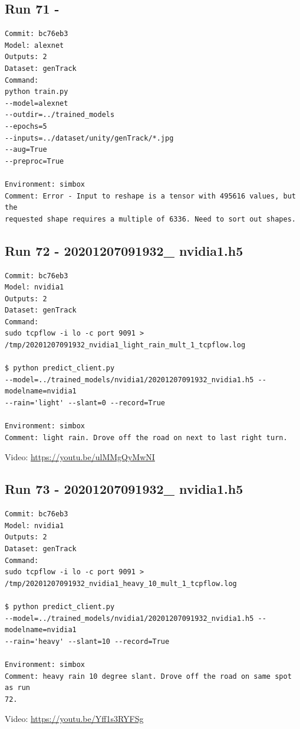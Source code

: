 \subsection{Run 71 - }
\label{app_res:XX}
\begin{verbatim}
Commit: bc76eb3 
Model: alexnet
Outputs: 2 
Dataset: genTrack
Command:
python train.py
--model=alexnet
--outdir=../trained_models
--epochs=5
--inputs=../dataset/unity/genTrack/*.jpg
--aug=True
--preproc=True

Environment: simbox
Comment: Error - Input to reshape is a tensor with 495616 values, but the
requested shape requires a multiple of 6336. Need to sort out shapes.
\end{verbatim}

\subsection{Run 72 - 20201207091932\_ nvidia1.h5 }
\label{app_res:72}
\begin{verbatim}
Commit: bc76eb3 
Model: nvidia1
Outputs: 2
Dataset: genTrack
Command:
sudo tcpflow -i lo -c port 9091 >
/tmp/20201207091932_nvidia1_light_rain_mult_1_tcpflow.log

$ python predict_client.py
--model=../trained_models/nvidia1/20201207091932_nvidia1.h5 --modelname=nvidia1
--rain='light' --slant=0 --record=True

Environment: simbox
Comment: light rain. Drove off the road on next to last right turn.
\end{verbatim}
Video: \url{https://youtu.be/ulMMgQyMwNI}

\subsection{Run 73 - 20201207091932\_ nvidia1.h5}
\label{app_res:73}
\begin{verbatim}
Commit: bc76eb3 
Model: nvidia1
Outputs: 2
Dataset: genTrack
Command:
sudo tcpflow -i lo -c port 9091 >
/tmp/20201207091932_nvidia1_heavy_10_mult_1_tcpflow.log

$ python predict_client.py
--model=../trained_models/nvidia1/20201207091932_nvidia1.h5 --modelname=nvidia1
--rain='heavy' --slant=10 --record=True

Environment: simbox
Comment: heavy rain 10 degree slant. Drove off the road on same spot as run
72.
\end{verbatim}
Video: \url{https://youtu.be/Yff1s3RYFSg}

